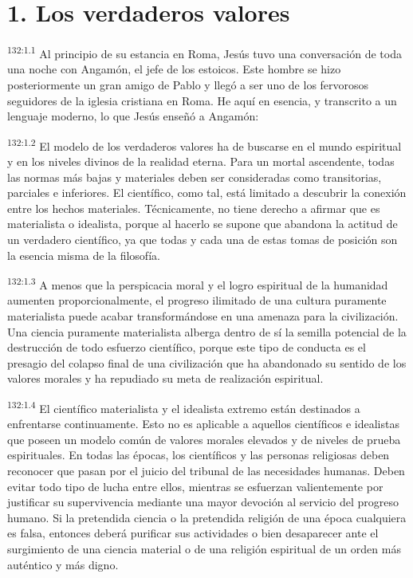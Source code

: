 \section*{1. Los verdaderos valores}
\par
\textsuperscript{132:1.1} Al principio de su estancia en Roma, Jesús tuvo una conversación de toda una noche con Angamón, el jefe de los estoicos. Este hombre se hizo posteriormente un gran amigo de Pablo y llegó a ser uno de los fervorosos seguidores de la iglesia cristiana en Roma. He aquí en esencia, y transcrito a un lenguaje moderno, lo que Jesús enseñó a Angamón:

\par
\textsuperscript{132:1.2} El modelo de los verdaderos valores ha de buscarse en el mundo espiritual y en los niveles divinos de la realidad eterna. Para un mortal ascendente, todas las normas más bajas y materiales deben ser consideradas como transitorias, parciales e inferiores. El científico, como tal, está limitado a descubrir la conexión entre los hechos materiales. Técnicamente, no tiene derecho a afirmar que es materialista o idealista, porque al hacerlo se supone que abandona la actitud de un verdadero científico, ya que todas y cada una de estas tomas de posición son la esencia misma de la filosofía.

\par
\textsuperscript{132:1.3} A menos que la perspicacia moral y el logro espiritual de la humanidad aumenten proporcionalmente, el progreso ilimitado de una cultura puramente materialista puede acabar transformándose en una amenaza para la civilización. Una ciencia puramente materialista alberga dentro de sí la semilla potencial de la destrucción de todo esfuerzo científico, porque este tipo de conducta es el presagio del colapso final de una civilización que ha abandonado su sentido de los valores morales y ha repudiado su meta de realización espiritual.

\par
\textsuperscript{132:1.4} El científico materialista y el idealista extremo están destinados a enfrentarse continuamente. Esto no es aplicable a aquellos científicos e idealistas que poseen un modelo común de valores morales elevados y de niveles de prueba espirituales. En todas las épocas, los científicos y las personas religiosas deben reconocer que pasan por el juicio del tribunal de las necesidades humanas. Deben evitar todo tipo de lucha entre ellos, mientras se esfuerzan valientemente por justificar su supervivencia mediante una mayor devoción al servicio del progreso humano. Si la pretendida ciencia o la pretendida religión de una época cualquiera es falsa, entonces deberá purificar sus actividades o bien desaparecer ante el surgimiento de una ciencia material o de una religión espiritual de un orden más auténtico y más digno.

